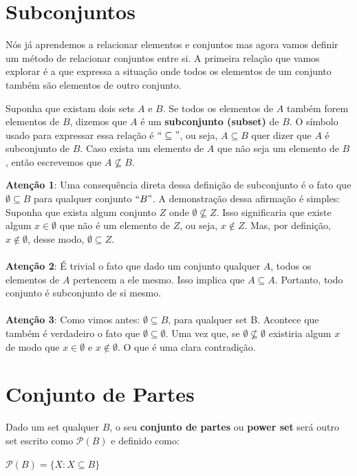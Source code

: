 \documentclass[main.tex]{subfiles}
\begin{document}
\section{Subconjuntos}
Nós já aprendemos a relacionar elementos e conjuntos mas agora vamos definir um método de relacionar conjuntos entre si. A primeira relação que vamos explorar é a que expressa a situação onde todos os elementos de um conjunto também são elementos de outro conjunto.

\begin{definition}[Subconjunto]
Suponha que existam dois sets $A$ e $B$. Se todos os elementos de $A$ também forem elementos de $B$, dizemos que $A$ é um \textbf{subconjunto (subset)} de $B$. O símbolo usado para expressar essa relação é $``\subseteq"$, ou seja, $A \subseteq B$ quer dizer que $A$ é subconjunto de $B$. Caso exista um elemento de $A$ que não seja um elemento de $B$, então escrevemos que $A \nsubseteq B$.
\end{definition}

\textbf{Atenção 1}: Uma consequência direta dessa definição de subconjunto é o fato que $\emptyset \subseteq B$ para qualquer conjunto $``B"$. A demonstração dessa afirmação é simples: Suponha que exista algum conjunto $Z$ onde $\emptyset \nsubseteq Z$. Isso significaria que existe algum $x \in \emptyset$ que não é um elemento de $Z$, ou seja, $x \notin Z$. Mas, por definição, $x \notin \emptyset$, desse modo, $\emptyset \subseteq Z$.
\\~\\
\textbf{Atenção 2}: É trivial o fato que dado um conjunto qualquer $A$, todos os elementos de $A$ pertencem a ele mesmo. Isso implica que $A \subseteq A$. Portanto, todo conjunto é subconjunto de si mesmo.
\\~\\
\textbf{Atenção 3}: Como vimos antes: $\emptyset \subseteq B$, para qualquer set B. Acontece que também é verdadeiro o fato que $\emptyset \subseteq \emptyset$. Uma vez que, se $\emptyset \nsubseteq \emptyset$ existiria algum $x$ de modo que $x \in \emptyset$ e $x \notin \emptyset$. O que é uma clara contradição.

\section{Conjunto de Partes}
\begin{definition}
Dado um set qualquer $B$, o seu \textbf{conjunto de partes} ou \textbf{power set} será outro set escrito como $\mathscr{P}(B)$ e definido como:
\begin{center}
	$\mathscr{P}(B) = \{ X : X \subseteq B \}$
\end{center}
\end{definition}
\end{document}

